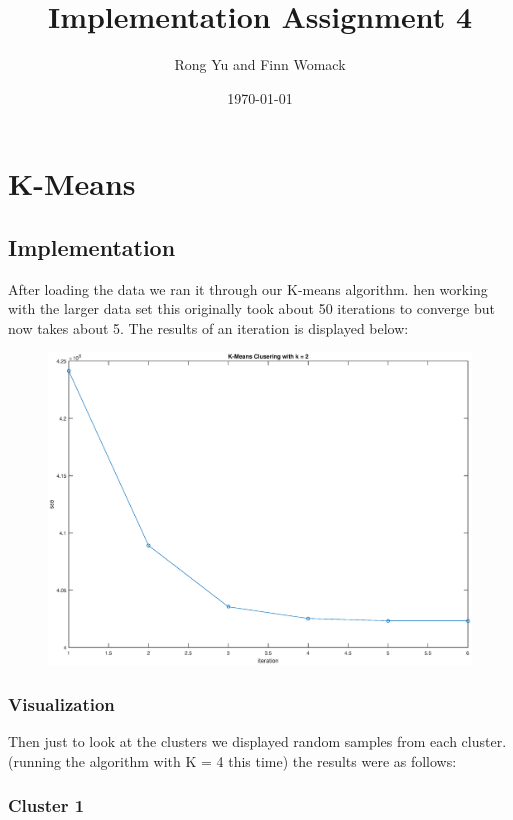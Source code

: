 \documentclass{article}
\title{Implementation Assignment 4}
\date{\today}
\author{Rong Yu and Finn Womack}
\begin{document}
	\maketitle
	\section{K-Means}
	\subsection{Implementation}

After loading the data we ran it through our K-means algorithm. hen working with the larger data set this originally took about 50 iterations to converge but now takes about 5. The results of an iteration is displayed below:
	
	\begin{figure}[h!]
		\begin{center} 
			\includegraphics[scale=0.4]{kmeans.eps} 
		\end{center} 
		\label{fig:M1}
	\end{figure}
	

	\subsubsection{Visualization}
	
	Then just to look at the clusters we displayed random samples from each cluster. (running the algorithm with K = 4 this time) the results were as follows:
	
	\subsubsection*{Cluster 1}
	
\end{document}
